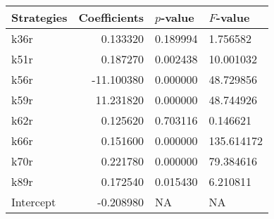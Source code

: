 \begin{tabular}{lrll}
\toprule
Strategies & Coefficients & $p$-value & $F$-value \\
\midrule
k36r & 0.133320 & 0.189994 & 1.756582 \\
k51r & 0.187270 & 0.002438 & 10.001032 \\
k56r & -11.100380 & 0.000000 & 48.729856 \\
k59r & 11.231820 & 0.000000 & 48.744926 \\
k62r & 0.125620 & 0.703116 & 0.146621 \\
k66r & 0.151600 & 0.000000 & 135.614172 \\
k70r & 0.221780 & 0.000000 & 79.384616 \\
k89r & 0.172540 & 0.015430 & 6.210811 \\
Intercept & -0.208980 & NA & NA \\
\bottomrule
\end{tabular}
